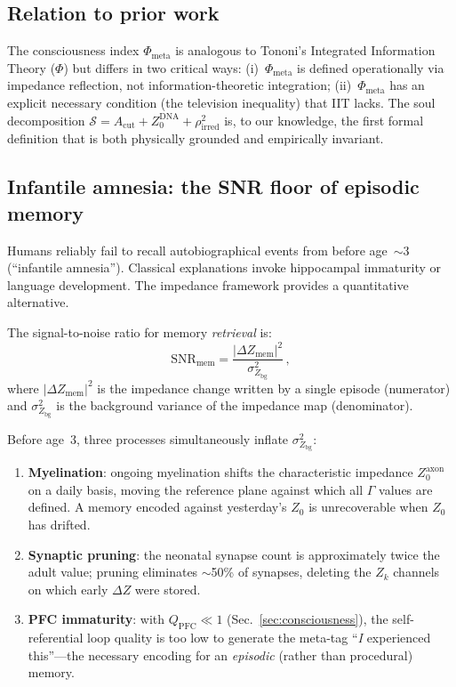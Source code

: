 \documentclass[aps,pre,twocolumn,superscriptaddress,floatfix]{revtex4-2}
\newcommand{\Phimeta}{\Phi_{\text{meta}}}
\newcommand{\Acut}{A_{\text{cut}}}
\begin{document}
\subsection{Relation to prior work}

The consciousness index $\Phimeta$ is analogous to
Tononi's Integrated Information Theory ($\Phi$) but differs
in two critical ways:
(i)~$\Phimeta$ is defined operationally via impedance
reflection, not information-theoretic integration;
(ii)~$\Phimeta$ has an explicit necessary condition
(the television inequality) that IIT lacks.
The soul decomposition $\mathcal{S}=\Acut+Z_0^{\text{DNA}}+\rho_{\text{irred}}^2$
is, to our knowledge, the first formal definition that is
both physically grounded and empirically invariant.


\subsection{Infantile amnesia: the SNR floor of episodic memory}
\label{sec:infantile-amnesia}

Humans reliably fail to recall autobiographical events
from before age~$\sim$3 (``infantile amnesia'').
Classical explanations invoke hippocampal immaturity or
language development.  The impedance framework provides a
quantitative alternative.

The signal-to-noise ratio for memory \emph{retrieval}
is:
\begin{equation}
  \mathrm{SNR}_{\text{mem}} =
    \frac{|\Delta Z_{\text{mem}}|^2}
         {\sigma^2_{Z_{\text{bg}}}}\,,
  \label{eq:SNR-mem}
\end{equation}
where
$|\Delta Z_{\text{mem}}|^2$ is the impedance change
written by a single episode (numerator) and
$\sigma^2_{Z_{\text{bg}}}$ is the background variance of
the impedance map (denominator).

Before age~3, three processes simultaneously inflate
$\sigma^2_{Z_{\text{bg}}}$:
\begin{enumerate}
  \item \textbf{Myelination}: ongoing myelination
    shifts the characteristic impedance
    $Z_0^{\text{axon}}$ on a daily basis,
    moving the reference plane against which all
    $\Gamma$ values are defined.
    A memory encoded against yesterday's $Z_0$ is
    unrecoverable when $Z_0$ has drifted.
  \item \textbf{Synaptic pruning}: the neonatal synapse
    count is approximately twice the adult value;
    pruning eliminates $\sim$50\% of synapses,
    deleting the $Z_k$ channels on which early
    $\Delta Z$ were stored.
  \item \textbf{PFC immaturity}: with $Q_{\text{PFC}}\ll 1$
    (Sec.~\ref{sec:consciousness}), the self-referential
    loop quality is too low to generate the meta-tag
    ``\emph{I} experienced this''---the necessary encoding
    for an \emph{episodic} (rather than procedural) memory.
\end{enumerate}
\end{document}
